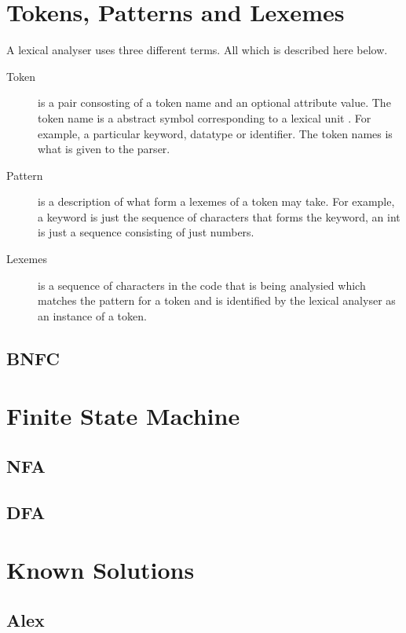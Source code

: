 \section{Tokens, Patterns and Lexemes}
A lexical analyser uses three different terms. All which is described here below. 
\begin{description}
  \item[Token]
    is a pair consosting of a token name and an optional attribute value. The token name is a abstract symbol corresponding to a lexical unit \cite{Aho2006}. For example, a particular keyword, datatype or identifier.  The token names is what is given to the parser. 
  \item[Pattern]
    is a description of what form a lexemes of a token may take. \cite{Aho2006} For example, a keyword is just the sequence of characters that forms the keyword, an int is just a sequence consisting of just numbers. 
  \item[Lexemes]
    is a sequence of characters in the code that is being analysied which matches the pattern for a token and is identified by the lexical analyser as an instance of a token. \cite{Aho2006}
\end{description}
\subsection{BNFC}
\section{Finite State Machine}
\subsection{NFA}
\subsection{DFA}
\section{Known Solutions}
\subsection{Alex}

 
